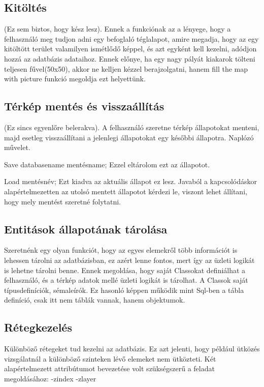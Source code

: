 \begin{sql}
\subsection{Kitöltés}

(Ez sem biztos, hogy kész lesz).  Ennek a funkciónak az a lényege, hogy a felhasználó meg tudjon adni egy befoglaló téglalapot, amire megadja, hogy az egy kitöltött terület valamilyen ismétlődő képpel, és azt egyként kell kezelni, adódjon hozzá az adatbázis adataihoz. Ennek előnye, ha egy nagy pályát kiakarok tölteni teljesen fűvel(50x50), akkor ne kelljen kézzel berajzolgatni, hanem fill the map with picture funkció megoldja ezt helyettünk.

\subsection{Térkép mentés és visszaállítás}

(Ez sincs egyenlőre belerakva). A felhasználó szeretne térkép állapotokat menteni, majd esetleg visszaállítani a jelenlegi állapotokat egy későbbi állapotra. Naplózó művelet.

Save databasename mentésname;
Ezzel eltárolom ezt az állapotot.

Load mentésnév;
Ezt kiadva az aktuális állapot ez lesz. Javaból a kapcsolódáskor alapértelmezetten az utolsó mentett állapotot kérdezi le, viszont lehet állítani, hogy mely mentést szeretné folytatni.

\subsection{Entitások állapotának tárolása}

Szeretnénk egy olyan funkciót, hogy az egyes elemekről több információt is lehessen tárolni az adatbázisban, ez azért lenne fontos, mert így az üzleti logikát is lehetne tárolni benne. Ennek megoldása, hogy saját Classokat definiálhat a felhasználó, és a térkép adatok mellé üzleti logikát is tárolhat. A Classok saját típusdefiníciók, sémaleírók. Ez hasonló képpen működik mint Sql-ben a tábla definíció, csak itt nem táblák vannak, hanem objektumok.

\subsection{Rétegkezelés}

Különböző rétegeket tud kezelni az adatbázis. Ez azt jelenti, hogy például ütközés vizsgálatnál a különböző szinteken lévő elemeket nem ütközteti. Két alapértelmezett attribútumot bevezetése volt szükségszerű a feladat megoldásához:
-zindex
-zlayer


\end{sql}
